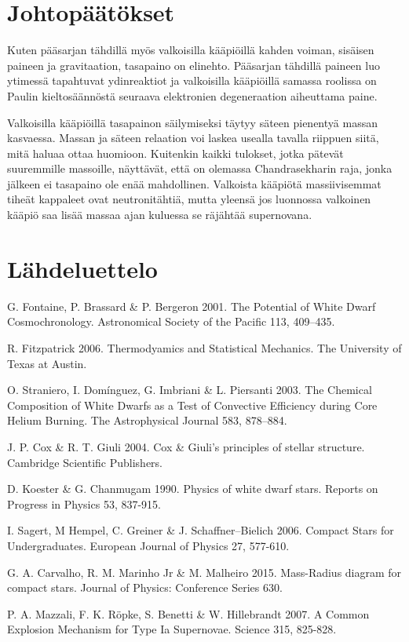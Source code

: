 \documentclass[12pt,a4paper,titlepage]{article}
\begin{document}
\section{Johtopäätökset}

Kuten pääsarjan tähdillä myös valkoisilla kääpiöillä kahden voiman, sisäisen paineen ja gravitaation, tasapaino on elinehto. Pääsarjan tähdillä paineen luo ytimessä tapahtuvat ydinreaktiot ja valkoisilla kääpiöillä samassa roolissa on Paulin kieltosäännöstä seuraava elektronien degeneraation aiheuttama paine.

Valkoisilla kääpiöillä tasapainon säilymiseksi täytyy säteen pienentyä massan kasvaessa. Massan ja säteen relaation voi laskea usealla tavalla riippuen siitä, mitä haluaa ottaa huomioon. Kuitenkin kaikki tulokset, jotka pätevät suuremmille massoille, näyttävät, että on olemassa Chandrasekharin raja, jonka jälkeen ei tasapaino ole enää mahdollinen. Valkoista kääpiötä massiivisemmat tiheät kappaleet ovat neutronitähtiä, mutta yleensä jos luonnossa valkoinen kääpiö saa lisää massaa ajan kuluessa se räjähtää supernovana.


\newpage
\section{Lähdeluettelo}
{\footnotesize 
G. Fontaine, P. Brassard \& P. Bergeron 2001. The Potential of White Dwarf Cosmochronology. Astronomical Society of the Pacific 113, 409–435.
 
R. Fitzpatrick 2006. Thermodyamics and Statistical Mechanics. The University of Texas at Austin.

O. Straniero, I. Domínguez, G. Imbriani \& L. Piersanti 2003. The Chemical Composition of White Dwarfs as a Test of Convective Efficiency during Core Helium Burning. The Astrophysical Journal 583, 878–884.

J. P. Cox \& R. T. Giuli 2004. Cox \& Giuli's principles of stellar structure. Cambridge Scientific Publishers. 

D. Koester \& G. Chanmugam 1990. Physics of white dwarf stars. Reports on Progress in Physics 53, 837-915.

I. Sagert, M Hempel, C. Greiner \& J. Schaffner–Bielich 2006. Compact Stars for Undergraduates. European Journal of Physics 27, 577-610.

G. A. Carvalho, R. M. Marinho Jr \& M. Malheiro 2015. Mass-Radius diagram for compact stars. Journal of Physics: Conference Series 630.

P. A. Mazzali, F. K. Röpke, S. Benetti \& W. Hillebrandt 2007. A Common Explosion Mechanism for Type Ia Supernovae. Science 315, 825-828.
}




\appendix
\end{document}
